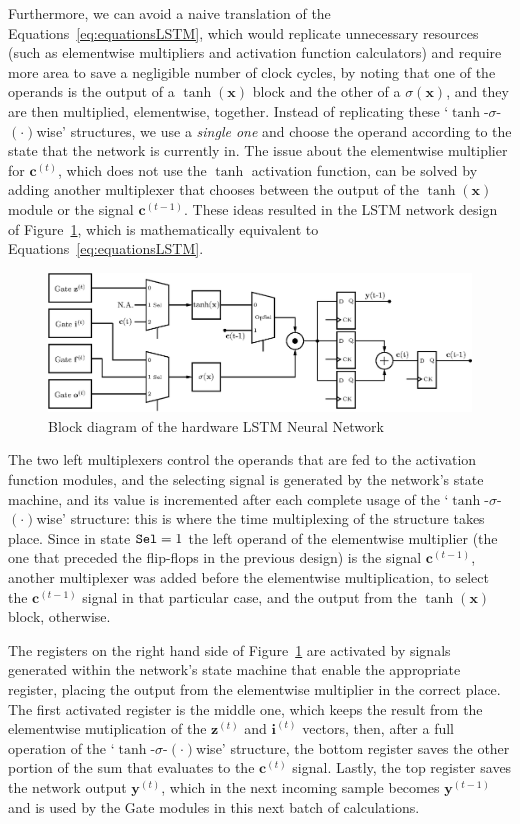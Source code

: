\documentclass{IEEEtran}
\newcommand{\mb}[1]{\mathbf{#1}}
\begin{document}
Furthermore, we can avoid a naive translation of the Equations~\ref{eq:equationsLSTM}, which would replicate unnecessary resources (such as elementwise multipliers
and activation function calculators) and require more area to save a negligible number of clock cycles, by noting that one of the operands is the output
of a $\tanh(\mb{x})$ block and the other of a $\sigma(\mb{x})$, and they are then multiplied, elementwise, together. Instead of replicating
these `$\tanh$-$\sigma$-$(\cdot)$wise' structures, we use a \emph{single one} and choose the operand according to the state that the network is currently in. The
issue about the elementwise multiplier for $\mb{c}^{(t)}$, which does not use the $\tanh$ activation function, can be solved by adding another multiplexer that chooses
between the output of the $\tanh(\mb{x})$ module or the signal $\mb{c}^{(t-1)}$. These ideas resulted in the LSTM network design of Figure~\ref{fig:network-opt}, which
is mathematically equivalent to Equations~\ref{eq:equationsLSTM}.

\begin{figure}
    \centering
    \includegraphics[width=0.9\linewidth]{figures/network-opt.eps}
    \caption[Block diagram of the hardware LSTM Neural Network]{Block diagram of the hardware LSTM Neural Network}
    \label{fig:network-opt}
\end{figure}
The two left multiplexers control the operands that are fed to the activation function modules, and the selecting signal is generated by the network's state machine,
and its value is incremented after each complete usage of the `$\tanh$-$\sigma$-$(\cdot)$wise' structure: this is where the time multiplexing of the structure takes place.
Since in state $\verb+Sel+=1$ the left operand of the elementwise multiplier (the one that preceded the flip-flops in the previous design) is the signal $\mb{c}^{(t-1)}$,
another multiplexer was added before the elementwise multiplication, to select the $\mb{c}^{(t-1)}$ signal in that particular case, and the output from the $\tanh(\mb{x})$ block, otherwise.

The registers on the right hand side of Figure~\ref{fig:network-opt} are activated by signals generated within the network's state machine that enable the appropriate register, placing the
output from the elementwise multiplier in the correct place. The first activated register is the middle one, which keeps the result from the elementwise mutiplication of the $\mb{z}^{(t)}$
and $\mb{i}^{(t)}$ vectors, then, after a full operation of the `$\tanh$-$\sigma$-$(\cdot)$wise' structure, the bottom register saves the other portion of the sum that evaluates to the $\mb{c}^{(t)}$
signal. Lastly, the top register saves the network output $\mb{y}^{(t)}$, which in the next incoming sample becomes $\mb{y}^{(t-1)}$ and is used by the Gate modules in this next batch of calculations.
\end{document}
